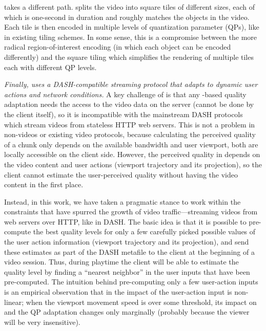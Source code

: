 \name takes a different path. 
\name splits the \vr video into square tiles of different sizes, each of which is one-second in duration and roughly matches the objects in the video. Each tile is then encoded in multiple levels of quantization parameter (QPs), like in existing tiling schemes.
In some sense, this is a compromise between the more radical region-of-interest encoding (in which each object can be encoded differently) and the square tiling which simplifies the rendering of multiple tiles each with different QP levels.



\vspace{0.2cm}
{\em Finally, \name uses a DASH-compatible streaming protocol that adapts to dynamic user actions and network conditions.}
A key challenge of \vrjnd is that any \vrjnd-based quality adaptation needs the access to the video data on the server (\ie cannot be done by the client itself), so it is incompatible with the mainstream DASH protocols which stream videos from stateless HTTP web servers. 
This is not a problem in non-\vr videos or existing \vr video protocols, because calculating the perceived quality of a chunk only depends on the available bandwidth and user viewport, both are locally accessible on the client side.
However, the perceived quality in \vrjnd depends on the video content and user actions (\ie viewport trajectory and its projection), so the client cannot estimate the user-perceived quality without having the video content in the first place. 

Instead, in this work, we have taken a pragmatic stance to work within the constraints that have spurred the growth of video traffic---streaming videos from web servers over HTTP, like in DASH.
The basic idea is that it is possible to pre-compute the best quality levels for only a few carefully picked possible values of the user action information (viewport trajectory and its projection), and send these estimates as part of the DASH metafile to the client at the beginning of a video session. 
Thus, during playtime the client will be able to estimate the quality level by finding a ``nearest neighbor'' in the user inputs that have been pre-computed. 
The intuition behind pre-computing only a few user-action inputs is an empirical observation that in \vrjnd the impact of the user-action input is non-linear; \eg when the viewport movement speed is over some threshold, its impact on \vrjnd and the QP adaptation changes only marginally (probably because the viewer will be very insensitive).


